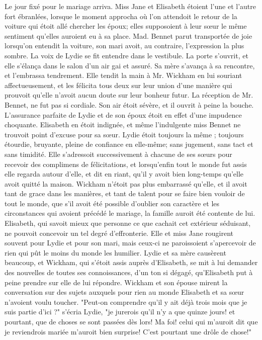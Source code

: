 Le jour fixé pour le mariage arriva. Miss Jane et Elisabeth étoient l’une et l’autre fort ébranlées, lorsque le moment approcha où l’on attendoit le retour de la voiture qui étoit allé chercher les époux; elles supposoient à leur sœur le même sentiment qu’elles auroient eu à sa place. Mad. Bennet parut transportée de joie lorsqu’on entendit la voiture, son mari avoit, au contraire, l’expression la plus sombre.
La voix de Lydie se fit entendre dans le vestibule. La porte s’ouvrit, et elle s’élança dans le salon d’un air gai et assuré. Sa mère s’avança à sa rencontre, et l’embrassa tendrement. Elle tendit la main à Mr. Wickham en lui souriant affectueusement, et les félicita\setcounter{page}{121} tous deux sur leur union d'une manière qui prouvoit qu'elle n'avoit aucun doute sur leur bonheur futur.
La réception de Mr. Bennet, ne fut pas si cordiale. Son air étoit sévère, et il ouvrit à peine la bouche. L'assurance parfaite de Lydie et de son époux étoit en effet d'une impudence choquante. Elisabeth en étoit indignée, et même l'indulgente miss Bennet ne trouvoit point d'excuse pour sa sœur. Lydie étoit toujours la même ; toujours étourdie, bruyante, pleine de confiance en elle-même; sans jugement, sans tact et sans timidité. Elle s'adressoit successivement à chacune de ses sœurs pour recevoir des complimens de félicitations, et lorsqu'enfin tout le monde fut assis elle regarda autour d'elle, et dit en riant, qu'il y avoit bien long-temps qu'elle avoit quitté la maison.
Wickham n'étoit pas plus embarrassé qu'elle, et il avoit tant de grace dans les manières, et tant de talent pour se faire bien vouloir de tout le monde, que s'il avoit été possible d'oublier son caractère et les circonstances qui avoient précédé le mariage, la famille auroit été contente de lui.
Elisabeth, qui savoit mieux que personne ce que cachait cet extérieur séduisant, ne pouvoit concevoir un tel degré d'effronterie.\setcounter{page}{122} Elle et miss Jane rougirent souvent pour Lydie et pour son mari, mais ceux-ci ne paroissoient s'apercevoir de rien qui pût le moins du monde les humilier.
Lydie et sa mère causèrent beaucoup, et Wickham, qui s'étoit assis auprès d'Elisabeth, se mit à lui demander des nouvelles de toutes ses connoissances, d'un ton si dégagé, qu'Elisabeth put à peine prendre sur elle de lui répondre. Wickham et son épouse mirent la conversation sur des sujets auxquels pour rien au monde Elisabeth et sa sœur n'avoient voulu toucher.
"Peut-on comprendre qu'il y ait déjà trois mois que je suis partie d'ici ?" s'écria Lydie, "je jurerois qu'il n'y a que quinze jours! et pourtant, que de choses se sont passées dès lors! Ma foi! celui qui m'auroit dit que je reviendrois mariée m'auroit bien surprise! C'est pourtant une drôle de chose!"
